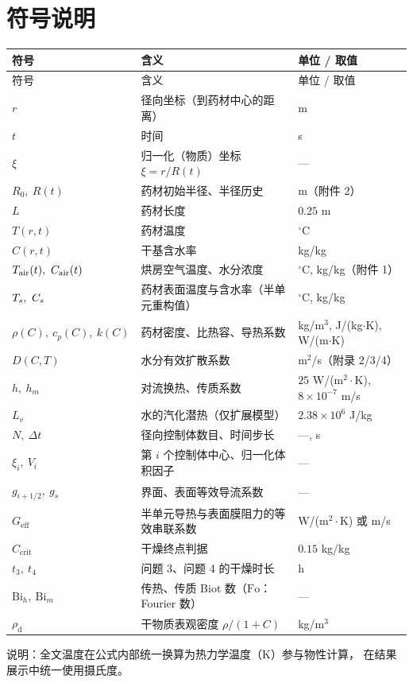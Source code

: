 \section{符号说明}

\begin{center}
\footnotesize
\begin{longtable}{@{}p{2.6cm}p{8.1cm}p{3.9cm}@{}}
\toprule
符号 & 含义 & 单位 / 取值 \\
\midrule
\endfirsthead
\toprule
符号 & 含义 & 单位 / 取值 \\
\midrule
\endhead
$r$ & 径向坐标（到药材中心的距离） & m \\
$t$ & 时间 & s \\
$\xi$ & 归一化（物质）坐标 $\xi=r/R(t)$ & --- \\
$R_0,\ R(t)$ & 药材初始半径、半径历史 & m（附件 2） \\
$L$ & 药材长度 & $0.25$ m \\
$T(r,t)$ & 药材温度 & $^\circ$C \\
$C(r,t)$ & 干基含水率 & kg/kg \\
$\Tair(t),\ \Cair(t)$ & 烘房空气温度、水分浓度 & $^\circ$C, kg/kg（附件 1） \\
$\Ts,\ \Cs$ & 药材表面温度与含水率（半单元重构值） & $^\circ$C, kg/kg \\
$\rho(C),\ c_p(C),\ k(C)$ & 药材密度、比热容、导热系数 & kg/m$^3$, J/(kg$\cdot$K), W/(m$\cdot$K) \\
$D(C,T)$ & 水分有效扩散系数 & m$^2$/s（附录 2/3/4） \\
$h,\ h_m$ & 对流换热、传质系数 & $25$ W/(m$^2\cdot$K), $8\times10^{-7}$ m/s \\
$L_v$ & 水的汽化潜热（仅扩展模型） & $2.38\times10^6$ J/kg \\
$N,\ \Delta t$ & 径向控制体数目、时间步长 & ---, s \\
$\xi_i,\ V_i$ & 第 $i$ 个控制体中心、归一化体积因子 & --- \\
$g_{i+1/2},\ g_s$ & 界面、表面等效导流系数 & --- \\
$G_{\mathrm{eff}}$ & 半单元导热与表面膜阻力的等效串联系数 & W/(m$^2\cdot$K) 或 m/s \\
$C_{\mathrm{crit}}$ & 干燥终点判据 & $0.15$ kg/kg \\
$t_3,\ t_4$ & 问题 3、问题 4 的干燥时长 & h \\
$\mathrm{Bi}_h,\ \mathrm{Bi}_m$ & 传热、传质 Biot 数（$\mathrm{Fo}$：Fourier 数） & --- \\
$\rho_{\mathrm{d}}$ & 干物质表观密度 $\rho/(1+C)$ & kg/m$^3$ \\
\bottomrule
\end{longtable}
\end{center}

\noindent 说明：全文温度在公式内部统一换算为热力学温度（K）参与物性计算，
在结果展示中统一使用摄氏度。
